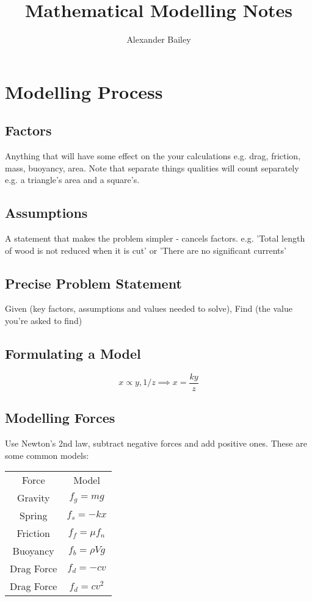 \documentclass[12pt] {article}
\begin{document}
\title{Mathematical Modelling Notes}
\author{Alexander Bailey}
\maketitle

\section{Modelling Process}
\subsection*{Factors}
Anything that will have some effect on the your calculations e.g. drag, friction, mass, buoyancy, area.
Note that separate things qualities will count separately e.g. a triangle's area and a square's.

\subsection*{Assumptions}
A statement that makes the problem simpler - cancels factors. 
e.g. 'Total length of wood is not reduced when it is cut'
or 'There are no significant currents' 

\subsection*{Precise Problem Statement}
Given (key factors, assumptions and values needed to solve), Find (the value you're asked to find)

\subsection*{Formulating a Model}
\begin{equation*}
x \propto y,1/z \implies x = \frac{ky}{z} 
\end{equation*}

\newpage
\subsection*{Modelling Forces}
Use Newton's 2nd law, subtract negative forces and add positive ones. These are some common models:

\begin{center}
\begin{tabular}{c|c}
  Force & Model \\
  Gravity & $f_g = mg$ \\
  Spring & $f_s = -kx$ \\
  Friction & $f_f = \mu f_n $ \\
  Buoyancy & $f_b = \rho V g$ \\
  Drag Force & $f_d = -cv $ \\
  Drag Force & $f_d = cv^2 $ \\
\end{tabular}
\end{center}
\end{document}
